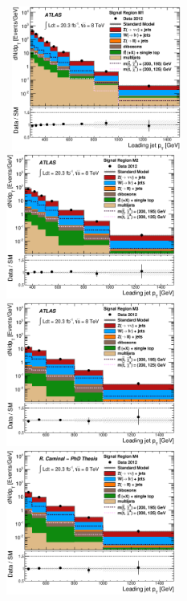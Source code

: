 \begin{figure}[!ht]
  \begin{center}
    \mbox{
      \includegraphics[width=0.495\textwidth]{MonojetAnalysis/Figures/plot_Stop_A6_SR_pt1_fitted.eps}
      \includegraphics[width=0.495\textwidth]{MonojetAnalysis/Figures/plot_Stop_A3_SR_pt1_fitted.eps}
    }
    \mbox{
      \includegraphics[width=0.495\textwidth]{MonojetAnalysis/Figures/plot_Stop_A4_SR_pt1_fitted.eps}
      \includegraphics[width=0.495\textwidth]{MonojetAnalysis/Figures/plot_Stop_A8_SR_pt1_fitted.eps}
}
\end{center}
\end{figure}
